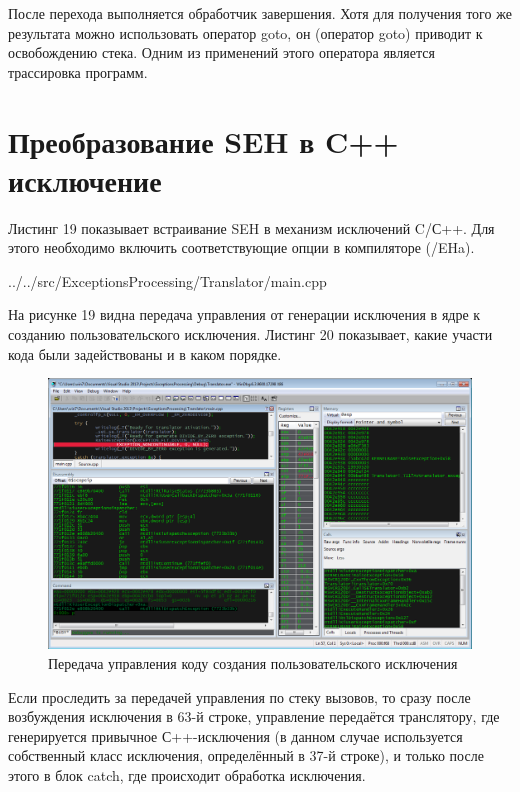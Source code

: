 \documentclass[a4paper, 12pt]{report}		%
\begin{document}
После перехода выполняется обработчик завершения. Хотя для получения того же результата можно использовать оператор goto, он (оператор goto) приводит к освобождению стека. Одним из применений этого оператора является трассировка программ.


\chapter*{Преобразование SEH в C++ исключение}

Листинг 19 показывает встраивание SEH в механизм исключений C/С++. Для этого необходимо включить соответствующие опции в компиляторе (/EHa)\cite{Dushutina, MSDN3}.


{../../src/ExceptionsProcessing/Translator/main.cpp}

На рисунке 19 видна передача управления от генерации исключения в ядре к созданию пользовательского исключения. Листинг 20 показывает, какие участи кода были задействованы и в каком порядке.

\begin{figure}[h!]
\centering
\includegraphics[scale=0.50]{res/012}
\caption{Передача управления коду создания пользовательского исключения}
\end{figure}
\newpage



Если проследить за передачей управления по стеку вызовов, то сразу после возбуждения исключения в 63-й строке, управление передаётся транслятору, где генерируется привычное С++-исключения (в данном случае используется собственный класс исключения, определённый в 37-й строке), и только после этого в блок catch, где происходит обработка исключения.
\end{document}
